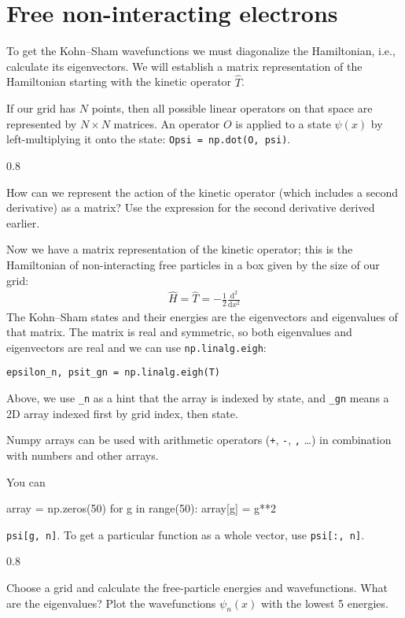 \documentclass{article}
\newcommand{\exercise}[1]{
  \bigskip
  \begin{boxedminipage}[c]{0.8\linewidth}
  #1
  \end{boxedminipage}
  \bigskip
}
\newcommand{\dee}[0]{\mathrm d}
\newcommand{\diff}[2]{\frac{\dee #1}{\dee #2}}
\begin{document}
\section{Free non-interacting electrons}

To get the Kohn--Sham wavefunctions we must diagonalize the
Hamiltonian, i.e., calculate its eigenvectors.  We will establish a matrix
representation of the Hamiltonian starting with the kinetic operator
$\hat T$.

If our grid has $N$ points, then all possible linear operators on that
space are represented by $N\times N$ matrices.  An operator $O$ is
applied to a state $\psi(x)$ by left-multiplying it onto the state:
\texttt{Opsi = np.dot(O, psi)}.

\exercise{
How can we represent the action of the kinetic operator (which
includes a second derivative) as a matrix?  Use the expression
for the second derivative derived earlier.
}

\noindent Now we have a matrix representation of the kinetic operator; this
is the Hamiltonian of non-interacting free particles in a box given by
the size of our grid:
\begin{align}
  \hat H = \hat T = -\frac12 \diff{^2}{x^2}
\end{align}
The Kohn--Sham states and their energies are the eigenvectors and
eigenvalues of that matrix.  The matrix is real and symmetric, so both eigenvalues and eigenvectors are real and we can use
\texttt{np.linalg.eigh}:
\begin{lstlisting}
epsilon_n, psit_gn = np.linalg.eigh(T)
\end{lstlisting}
Above, we use \lstinline{_n} as a hint that the array is indexed by state,
and \lstinline{_gn} means a 2D array indexed first by grid index, then state.

Numpy arrays can be used with arithmetic operators (\texttt +, \texttt -,
\texttt *, \ldots) in combination with numbers and other arrays.

You can 
\begin{lstinline}
array = np.zeros(50)
for g in range(50):
    array[g] = g**2
\end{lstinline}
\texttt{psi[g, n]}.  To get a particular function as a whole vector, use
\texttt{psi[:, n]}.

\exercise{
  Choose a grid and calculate the free-particle energies and wavefunctions.
  What are the eigenvalues?
  Plot the wavefunctions $\psi_n(x)$ with the lowest 5 energies.
}
\end{document}
